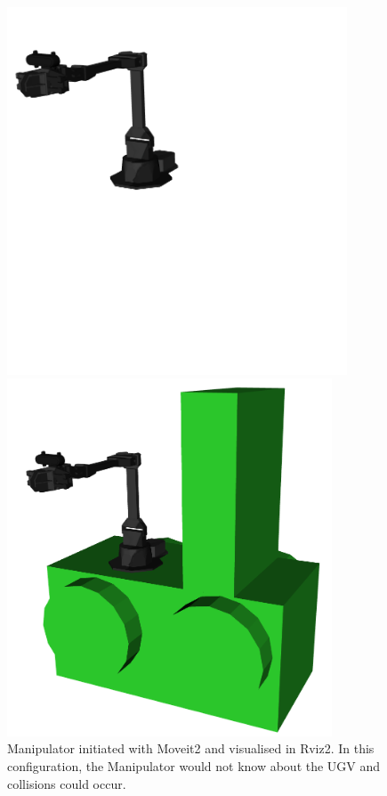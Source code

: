 \begin{figure}[ht]
  \centering
  \begin{minipage}[b]{0.49\textwidth}
        \centering
        \includegraphics[width = 0.9\textwidth]{Figures/figScenePublisher1.png}
        \caption{Manipulator initiated with Moveit2 and visualised in Rviz2. In this configuration, the Manipulator would not know about the UGV and collisions could occur.}
        \label{fig:R&D:P&P:CSP:scenePublisher1}
  \end{minipage}
  \hfill
  \begin{minipage}[b]{0.49\textwidth}
    \centering
    \includegraphics[width = 0.86\textwidth]{Figures/figScenePublisher2.png}

\end{minipage}
\end{figure}
